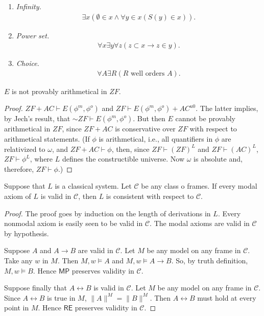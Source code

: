 \documentclass[manuscript]{BSLstyle} %
\begin{document}
\begin{fact}
\begin{enumerate}[resume*]
	\item \textit{Infinity.}
	\begin{align*}
	\exists x(\emptyset\in x\land\forall y\in x(S(y)\in x)).
	\end{align*}
	\item \textit{Power set.}
	\begin{align*}
	\forall x\exists y\forall z(z\subset x\to z\in y).
	\end{align*}
	\item \textit{Choice.}
	\begin{align*}
	\forall A\exists R(R\text{ well orders }A).
	\end{align*}
\end{enumerate}
\end{fact}

\begin{corollary}
	$E$ is not provably arithmetical in $ZF$.
\end{corollary}

\begin{proof}
	$ZF + AC \vdash E(\phi^m, \phi^o)$ and $ZF \vdash E(\phi^m, \phi^o) + AC^{u0}$. The latter implies, by Jech's result, that ${\sim}ZF \vdash E(\phi^m, \phi^o)$. But then $E$ cannot be provably arithmetical in $ZF$, since $ZF+AC$ is conservative over $ZF$ with respect to arithmetical statements. (If $\phi$ is arithmetical,	i.e., all quantifiers in $\phi$ are relativized to $\omega$, and $ZF + AC \vdash \phi$, then, since $ZF \vdash (ZF)^L$ and $ZF \vdash (AC)^L$, $ZF \vdash \phi^L$, where $L$ defines the constructible universe. Now $\omega$ is absolute and, therefore, $ZF \vdash \phi$.)
\end{proof}

\begin{proposition}
	Suppose that $L$ is a classical system. Let $\mathscr{C}$ be any class o frames. If every modal axiom of $L$ is valid in $\mathscr{C}$, then $L$ is consistent with respect to $\mathscr{C}$.
\end{proposition}

\begin{proof}
	The proof goes by induction on the length of derivations in $L$. Every nonmodal axiom is easily seen to be valid in $\mathscr{C}$. The modal axioms are valid in $\mathscr{C}$ by hypothesis.
	
	Suppose $A$ and $A\to B$ are valid in $\mathscr{C}$. Let $M$ be any model on any frame in $\mathscr{C}$. Take any $w$ in $M$. Then $M, w \models A$ and $M, w \models A\to B$. So, by truth definition, $M, w \models B$. Hence $\mathsf{MP}$ preserves validity in $\mathscr{C}$.
	
	Suppose finally that $A\leftrightarrow B$ is valid in $\mathscr{C}$. Let $M$ be any model on any frame in $\mathscr{C}$. Since $A\leftrightarrow B$ is true in $M$, $\lVert A\rVert^M = \lVert B\rVert^M$. Then $A\leftrightarrow B$ must hold at every point in $M$. Hence $\mathsf{RE}$ preserves validity in $\mathscr{C}$.
\end{proof}
\end{document}
